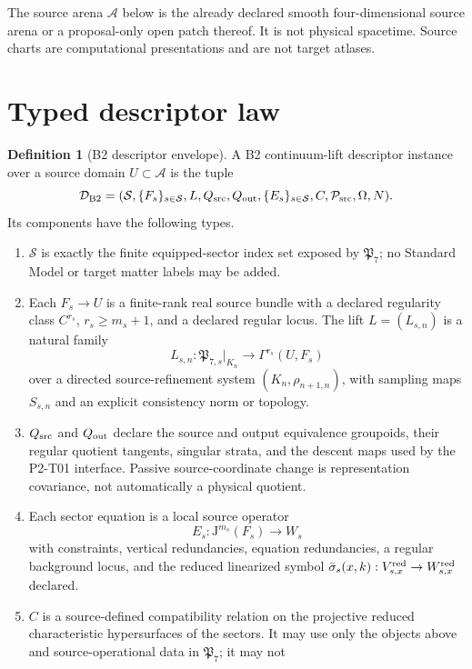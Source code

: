 \documentclass[11pt]{article}
\theoremstyle{definition}
\newtheorem{definition}{Definition}
\theoremstyle{plain}
\newcommand{\A}{\mathcal{A}}
\newcommand{\Sectors}{\mathcal{S}}
\newcommand{\Desc}{\mathcal{D}_{\mathrm{B2}}}
\newcommand{\Psrc}{\mathcal{P}_{\mathrm{src}}}
\newcommand{\J}{\mathrm{J}}
\begin{document}
The source arena $\A$ below is the already declared smooth four-dimensional
source arena or a proposal-only open patch thereof. It is not physical
spacetime. Source charts are computational presentations and are not target
atlases.

\section{Typed descriptor law}

\begin{definition}[B2 descriptor envelope]
A B2 continuum-lift descriptor instance over a source domain $U\subset\A$ is
the tuple
\begin{equation}
\Desc=
(\Sectors,\{F_s\}_{s\in\Sectors},L,Q_{\rm src},Q_{\rm out},
\{E_s\}_{s\in\Sectors},C,\Psrc,\Omega,N).
\label{eq:descriptor}
\end{equation}
Its components have the following types.
\begin{enumerate}[label=\textbf{D\arabic*.}]
  \item $\Sectors$ is exactly the finite equipped-sector index set exposed by
  $\mathfrak P_7$; no Standard Model or target matter labels may be added.
  \item Each $F_s\to U$ is a finite-rank real source bundle with a declared
  regularity class $C^{r_s}$, $r_s\ge m_s+1$, and a declared regular locus.
  The lift $L=(L_{s,n})$ is a natural family
  \[
    L_{s,n}:\mathfrak P_{7,s}|_{K_n}\longrightarrow
    \Gamma^{r_s}(U,F_s)
  \]
  over a directed source-refinement system $(K_n,\rho_{n+1,n})$, with
  sampling maps $S_{s,n}$ and an explicit consistency norm or topology.
  \item $Q_{\rm src}$ and $Q_{\rm out}$ declare the source and output
  equivalence groupoids, their regular quotient tangents, singular strata,
  and the descent maps used by the P2-T01 interface. Passive source-coordinate
  change is representation covariance, not automatically a physical quotient.
  \item Each sector equation is a local source operator
  \[
    E_s:\J^{m_s}(F_s)\longrightarrow W_s
  \]
  with constraints, vertical redundancies, equation redundancies, a regular
  background locus, and the reduced linearized symbol
  $\bar\sigma_s(x,k):V^{\rm red}_{s,x}\to W^{\rm red}_{s,x}$ declared.
  \item $C$ is a source-defined compatibility relation on the projective
  reduced characteristic hypersurfaces of the sectors. It may use only the
  objects above and source-operational data in $\mathfrak P_7$; it may not

\end{enumerate}
\end{definition}
\end{document}
